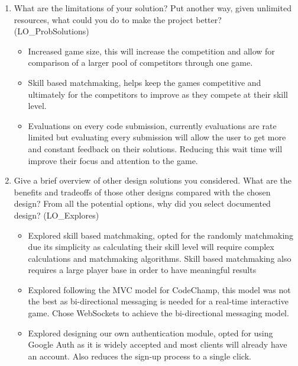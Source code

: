 \documentclass[12pt, titlepage]{article}
\begin{document}
\begin{enumerate}
  \item What are the limitations of your solution?  Put another way, given
  unlimited resources, what could you do to make the project better? (LO\_ProbSolutions)
   
   \begin{itemize}
       \item Increased game size, this will increase the competition and allow for comparison of a larger pool of competitors through one game.
       \item Skill based matchmaking, helps keep the games competitive and ultimately for the competitors to improve as they compete at their skill level.
       \item Evaluations on every code submission, currently evaluations are rate limited but evaluating every submission will allow the user to get more and constant feedback on their solutions. Reducing this wait time will improve their focus and attention to the game.
   \end{itemize} 

  \item Give a brief overview of other design solutions you considered.  What
  are the benefits and tradeoffs of those other designs compared with the chosen
  design?  From all the potential options, why did you select documented design?
  (LO\_Explores)
  
  \begin{itemize}
      \item Explored skill based matchmaking, opted for the randomly matchmaking due its simplicity as calculating their skill level will require complex calculations and matchmaking algorithms. Skill based matchmaking also requires a large player base in order to have meaningful results
      \item Explored following the MVC model for CodeChamp, this model was not the best as bi-directional messaging is needed for a real-time interactive game. Chose WebSockets to achieve the bi-directional messaging model. 
      \item Explored designing our own authentication module, opted for using Google Auth as it is widely accepted and most clients will already have an account. Also reduces the sign-up process to a single click. 
  \end{itemize}
  
\end{enumerate}
\end{document}
